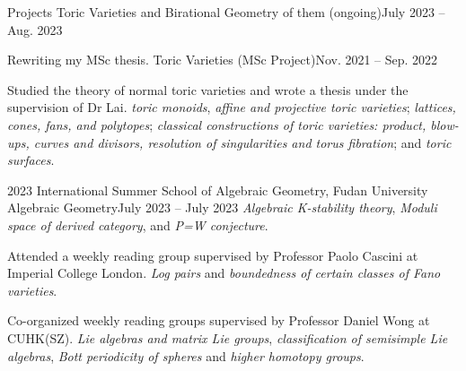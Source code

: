 \HeadingItemListStart
	\HeadingItemPlain
		{Projects}{}
	\SubHeadingItem
		{Toric Varieties and Birational Geometry of them (ongoing)}{July 2023 -- Aug. 2023}
		\ItemListStart
			\item Rewriting my MSc thesis.
		\ItemListEnd
	\SubHeadingItem
		{Toric Varieties (MSc Project)}{Nov. 2021 -- Sep. 2022}
		\ItemListStart
			\item Studied the theory of normal toric varieties and wrote a thesis under the supervision of Dr Lai.
				{\textit{toric monoids}, \textit{affine and projective toric varieties};
				\textit{lattices, cones, fans, and polytopes};
				\textit{classical constructions of toric varieties: product, blow-ups, curves and divisors, resolution of singularities and torus fibration};
				 and \textit{toric surfaces}.}
		\ItemListEnd

	\HeadingItem
		{2023 International Summer School of Algebraic Geometry, Fudan University}{}
		{Algebraic Geometry}{July 2023 -- July 2023}
		\ItemListStart
				{\textit{Algebraic K-stability theory}, \textit{Moduli space of derived category}, and \textit{P=W conjecture}.}
		\ItemListEnd

		\ItemListStart
			\item Attended a weekly reading group supervised by Professor Paolo Cascini at Imperial College London.
				{\textit{Log pairs} and \textit{boundedness of certain classes of Fano varieties}.}
		\ItemListEnd
		\ItemListStart
			\item Co-organized weekly reading groups supervised by Professor Daniel Wong at CUHK(SZ).
				{\textit{Lie algebras and matrix Lie groups},
				 \textit{classification of semisimple Lie algebras},
				 \textit{Bott periodicity of spheres} and \textit{higher homotopy groups}.}
		\ItemListEnd

		
\HeadingItemListEnd


